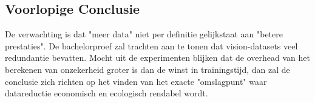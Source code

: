 \subsection{Voorlopige Conclusie}
De verwachting is dat "meer data" niet per definitie gelijkstaat aan "betere prestaties". De bachelorproef zal trachten aan te tonen dat vision-datasets veel redundantie bevatten. Mocht uit de experimenten blijken dat de overhead van het berekenen van onzekerheid groter is dan de winst in trainingstijd, dan zal de conclusie zich richten op het vinden van het exacte "omslagpunt" waar datareductie economisch en ecologisch rendabel wordt.
